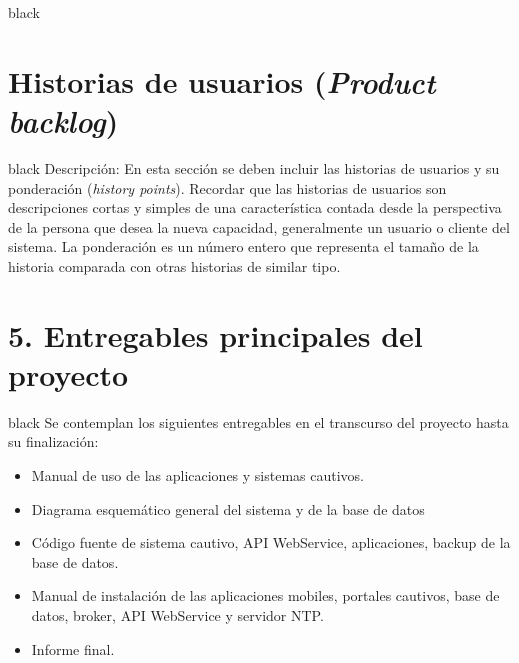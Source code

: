 \documentclass[11pt]{charter}
\begin{document}
\begin{consigna}{black}
\begin{enumerate}
\begin{enumerate}
	\end{enumerate}		
\end{enumerate}
%
%
%
%
%
\end{consigna}

\section{Historias de usuarios (\textit{Product backlog})}
\label{sec:backlog}

\begin{consigna}{black}
Descripción: En esta sección se deben incluir las historias de usuarios y su ponderación (\textit{history points}). Recordar que las historias de usuarios son descripciones cortas y simples de una característica contada desde la perspectiva de la persona que desea la nueva capacidad, generalmente un usuario o cliente del sistema. La ponderación es un número entero que representa el tamaño de la historia comparada con otras historias de similar tipo.
\end{consigna}

\section{5. Entregables principales del proyecto}
\label{sec:entregables}

\begin{consigna}{black}
Se contemplan los siguientes entregables en el transcurso del proyecto hasta su finalización: 
	\begin{itemize}
		\item Manual de uso de las aplicaciones y sistemas cautivos.
		\item Diagrama esquemático general del sistema y de la base de datos
		\item Código fuente de sistema cautivo, API WebService, aplicaciones, backup de la  base de datos.
		\item Manual de instalación de las aplicaciones mobiles, portales cautivos, base de datos, broker, API WebService y servidor NTP.
		\item Informe final.
	\end{itemize}
\end{consigna}
\end{document}
